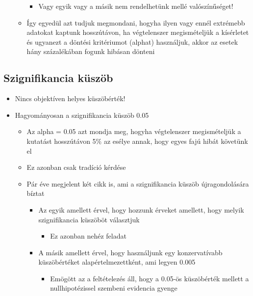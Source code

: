 \documentclass[
  letterpaper,
  DIV=11,
  numbers=noendperiod]{scrreprt}
\providecommand{\tightlist}{%
  \setlength{\itemsep}{0pt}\setlength{\parskip}{0pt}}\usepackage{longtable,booktabs,array}
\begin{document}
\begin{itemize}
\begin{itemize}
    \begin{itemize}
    \tightlist
    \item
      Vagy egyik vagy a másik nem rendelhetünk mellé valószínűséget!
    \end{itemize}
  \item
    Így egyedül azt tudjuk megmondani, hogyha ilyen vagy ennél extrémebb
    adatokat kaptunk hosszútávon, ha végtelenszer megismételjük a
    kísérletet és ugyanezt a döntési kritériumot (alphat) használjuk,
    akkor az esetek hány százalékában fogunk hibásan dönteni
  \end{itemize}
\end{itemize}

\hypertarget{szignifikancia-kuxfcszuxf6b}{%
\subsection{Szignifikancia küszöb}\label{szignifikancia-kuxfcszuxf6b}}

\begin{itemize}
\item
  Nincs objektíven helyes küszöbérték!
\item
  Hagyományosan a szignifikancia küszöb 0.05

  \begin{itemize}
  \item
    Az alpha = 0.05 azt mondja meg, hogyha végtelenszer megismételjük a
    kutatást hosszútávon 5\% az esélye annak, hogy egyes fajú hibát
    követünk el
  \item
    Ez azonban csak tradíció kérdése
  \item
    Pár éve megjelent két cikk is, ami a szignifikancia küszöb
    újragondolására bíztat

    \begin{itemize}
    \item
      Az egyik amellett érvel, hogy hozzunk érveket amellett, hogy
      melyik szignifikancia küszöböt választjuk

      \begin{itemize}
      \tightlist
      \item
        Ez azonban nehéz feladat
      \end{itemize}
    \item
      A másik amellett érvel, hogy használjunk egy konzervatívabb
      küszöbértéket alapértelmezettként, ami legyen 0.005

      \begin{itemize}
      \tightlist
      \item
        Emögött az a feltételezés áll, hogy a 0.05-ös küszöbérték
        mellett a nullhipotézissel szembeni evidencia gyenge
      \end{itemize}
    \end{itemize}
  \end{itemize}
\end{itemize}
\end{document}
